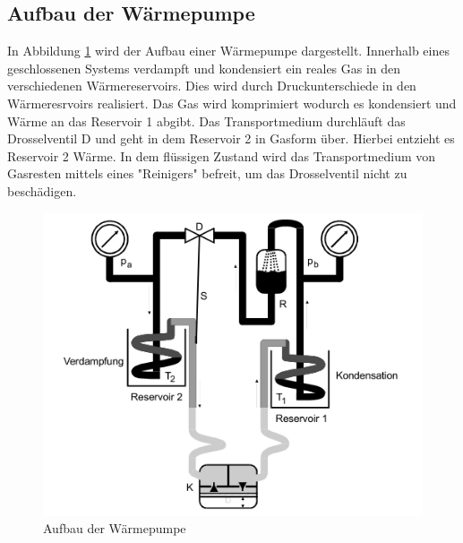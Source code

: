 \subsection{Aufbau der Wärmepumpe}
\label{sec:AdW}
In Abbildung \ref{fig:aufbau} wird der Aufbau einer Wärmepumpe dargestellt.
Innerhalb eines geschlossenen Systems verdampft und kondensiert ein reales Gas in den verschiedenen Wärmereservoirs.
Dies wird durch Druckunterschiede in den Wärmeresrvoirs realisiert.
Das Gas wird komprimiert wodurch es kondensiert und Wärme an das Reservoir 1 abgibt.
Das Transportmedium durchläuft das Drosselventil D und geht in dem Reservoir 2 in Gasform über.
Hierbei entzieht es Reservoir 2 Wärme.
In dem flüssigen Zustand wird das Transportmedium von Gasresten mittels eines "Reinigers" befreit, um das Drosselventil nicht zu beschädigen.
\begin{figure}[H]
    \centering
    \includegraphics[width=\textwidth]{content/aufbau.png}
    \caption{Aufbau der Wärmepumpe}
    \label{fig:aufbau}
\end{figure}
